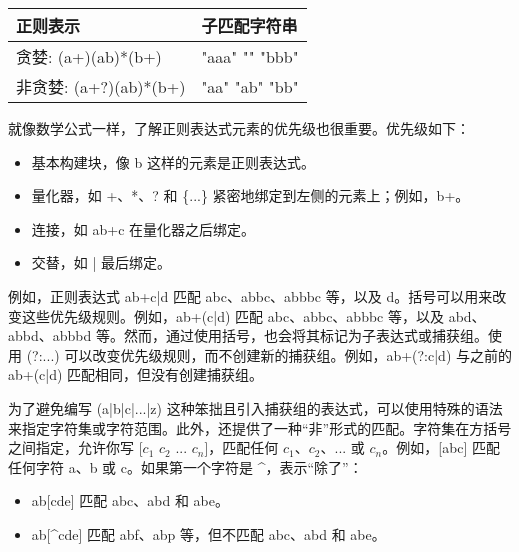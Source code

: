 \begin{longtable}{|l|l|}
\hline
\textbf{正则表示} & \textbf{子匹配字符串} \\ \hline
\endfirsthead
%
\endhead
%
贪婪: (a+)(ab)*(b+)       & "aaa" "" "bbb"      \\ \hline
非贪婪: (a+?)(ab)*(b+)  & "aa" "ab" "bb"      \\ \hline
\end{longtable}


就像数学公式一样，了解正则表达式元素的优先级也很重要。优先级如下：

\begin{itemize}
\item
基本构建块，像 b 这样的元素是正则表达式。

\item
量化器，如 +、*、? 和 \{...\} 紧密地绑定到左侧的元素上；例如，b+。

\item
连接，如 ab+c 在量化器之后绑定。

\item
交替，如 | 最后绑定。
\end{itemize}

例如，正则表达式 ab+c|d 匹配 abc、abbc、abbbc 等，以及 d。括号可以用来改变这些优先级规则。例如，ab+(c|d) 匹配 abc、abbc、abbbc 等，以及 abd、abbd、abbbd 等。然而，通过使用括号，也会将其标记为子表达式或捕获组。使用 (?:...) 可以改变优先级规则，而不创建新的捕获组。例如，ab+(?:c|d) 与之前的 ab+(c|d) 匹配相同，但没有创建捕获组。


为了避免编写 (a|b|c|...|z) 这种笨拙且引入捕获组的表达式，可以使用特殊的语法来指定字符集或字符范围。此外，还提供了一种“非”形式的匹配。字符集在方括号之间指定，允许你写 [$c_1$ $c_2$ ... $c_n$]，匹配任何 $c_1$、$c_2$、... 或 $c_n$。例如，[abc] 匹配任何字符 a、b 或 c。如果第一个字符是 \^{}，表示“除了”：

\begin{itemize}
\item
ab[cde] 匹配 abc、abd 和 abe。

\item
ab[\^{}cde] 匹配 abf、abp 等，但不匹配 abc、abd 和 abe。
\end{itemize}

